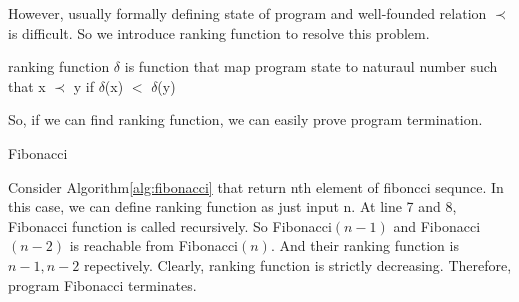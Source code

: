 However, usually formally defining state of program and well-founded relation $\prec$ is difficult.
So we introduce ranking function to resolve this problem.
\begin{definition}
    ranking function $\delta$ is function that map program state to naturaul number such that
    x $\prec$ y if $\delta$(x) $<$ $\delta$(y) 
\end{definition}
So, if we can find ranking function, we can easily prove program termination.
\begin{example}
    \begin{algorithm}[t]
        \caption{Fibonacci}
        \label{alg:fibonacci}
    \end{algorithm}
    Consider Algorithm\ref{alg:fibonacci} that return nth element of fiboncci sequnce.
    In this case, we can define ranking function as just input n.
    At line 7 and 8, Fibonacci function is called recursively.
    So Fibonacci$(n-1)$ and Fibonacci$(n-2)$ is reachable from Fibonacci$(n)$.
    And their ranking function is $n-1, n-2$ repectively.
    Clearly, ranking function is strictly decreasing.
    Therefore, program Fibonacci terminates. 
\end{example}
